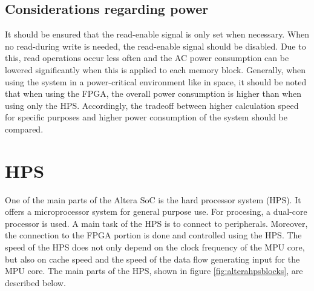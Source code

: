 \subsection{Considerations regarding power}
It should be ensured that the read-enable signal is only set when necessary. When no read-during write is needed, the read-enable signal should be disabled. Due to this, read operations occur less often and the AC power consumption can be lowered significantly when this is applied to each memory block.\cite[chapter 1]{AlteraFPGA15} Generally, when using the system in a power-critical environment like in space, it should be noted that when using the FPGA, the overall power consumption is higher than when using only the HPS. Accordingly, the tradeoff between higher calculation speed for specific purposes and higher power consumption of the system should be compared.
\section{HPS}
One of the main parts of the Altera SoC is the hard processor system (HPS). It offers a microprocessor system for general purpose use. For procesing, a dual-core processor is used. A main task of the HPS is to connect to peripherals. Moreover, the connection to the FPGA portion is done and controlled using the HPS. The speed of the HPS does not only depend on the clock frequency of the MPU core, but also on cache speed and the speed of the data flow generating input for the MPU core. The main parts of the HPS, shown in figure \ref{fig:alterahpsblocks}, are described below.
